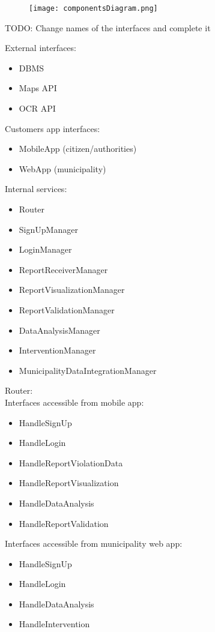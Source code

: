 \begin{figure}[H]
	\texttt{[image: componentsDiagram.png]}
\end{figure}
TODO: Change names of the interfaces and complete it

External interfaces:
\begin{itemize}
	\item DBMS
	\item Maps API
	\item OCR API
\end{itemize}

Customers app interfaces:
\begin{itemize}
	\item MobileApp (citizen/authorities)
	\item WebApp (municipality)
\end{itemize}

Internal services:
\begin{itemize}
	\item Router
	\item SignUpManager
	\item LoginManager
	\item ReportReceiverManager
	\item ReportVisualizationManager
	\item ReportValidationManager
	\item DataAnalysisManager
	\item InterventionManager
	\item MunicipalityDataIntegrationManager
\end{itemize}

\bigskip
Router:\\
Interfaces accessible from mobile app:
\begin{itemize}
	\item HandleSignUp
	\item HandleLogin
	\item HandleReportViolationData
	\item HandleReportVisualization
	\item HandleDataAnalysis
	\item HandleReportValidation
\end{itemize}
Interfaces accessible from municipality web app:
\begin{itemize}
	\item HandleSignUp
	\item HandleLogin
	\item HandleDataAnalysis
	\item HandleIntervention 
\end{itemize}

